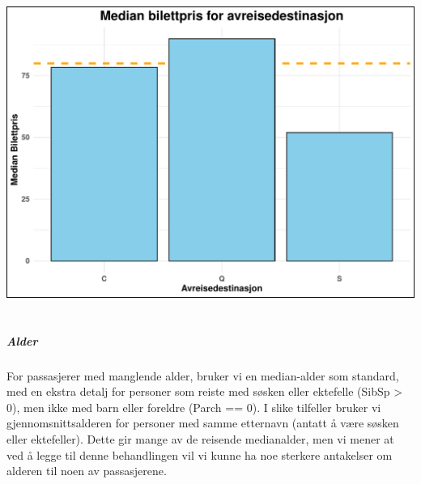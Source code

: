 \documentclass[
]{article}
\begin{document}
\begin{center}\includegraphics{presentation_files/figure-latex/unnamed-chunk-4-1} \end{center}

\section{}\label{section}

\subparagraph{Alder}\label{alder}

For passasjerer med manglende alder, bruker vi en median-alder som
standard, med en ekstra detalj for personer som reiste med søsken eller
ektefelle (SibSp \textgreater{} 0), men ikke med barn eller foreldre
(Parch == 0). I slike tilfeller bruker vi gjennomsnittsalderen for
personer med samme etternavn (antatt å være søsken eller ektefeller).
Dette gir mange av de reisende medianalder, men vi mener at ved å legge
til denne behandlingen vil vi kunne ha noe sterkere antakelser om
alderen til noen av passasjerene.
\end{document}
